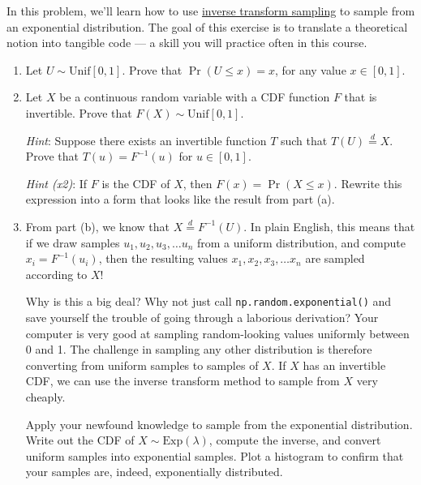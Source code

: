 \documentclass{harvardml}
\theoremstyle{definition}
\theoremstyle{plain}
\begin{document}
\begin{problem}
In this problem, we'll learn how to use \href{https://en.wikipedia.org/wiki/Inverse_transform_sampling}{inverse transform sampling}
to sample from an exponential distribution. The goal of this exercise is to
translate a theoretical notion into tangible code --- a skill you will practice
often in this course.

\begin{enumerate}[label=(\alph*)]
	\item Let $U \sim \text{Unif}[0, 1]$. Prove that $\Pr(U \leq x) = x$, for
	any value $x \in [0, 1]$. 
	\item Let $X$ be a continuous random variable with a CDF function $F$ that
	is invertible. Prove that $F(X) \sim \text{Unif}[0,1]$.

	\emph{Hint}: Suppose there exists an invertible function $T$ such that $T(U)
	\overset{d}{=} X$. Prove that $T(u) = F^{-1}(u)$ for $u \in [0, 1]$.

	\emph{Hint (x2)}: If $F$ is the CDF of $X$, then $F(x) = \Pr(X \leq x)$.
	Rewrite this expression into a form that looks like the result from
	part (a).

	\item From part (b), we know that $X \overset{d}{=} F^{-1}(U)$. In plain
	English, this means that if we draw samples $u_1, u_2, u_3, \ldots u_n$ from a
	uniform distribution, and compute $x_i = F^{-1}(u_i)$, then the resulting
	values $x_1, x_2, x_3, \ldots x_n$ are sampled according to $X$!
	
	Why is this a big deal? Why not just call \verb|np.random.exponential()| and
	save yourself the trouble of going through a laborious derivation? Your
	computer is very good at sampling random-looking values uniformly between 0
	and 1. The challenge in sampling any other distribution is therefore
	converting from uniform samples to samples of $X$. If $X$ has an invertible
	CDF, we can use the inverse transform method to sample from $X$ very cheaply.

	Apply your newfound knowledge to sample from the exponential distribution.
	Write out the CDF of $X \sim \text{Exp}(\lambda)$, compute the inverse, and 
	convert uniform samples into exponential samples. Plot a histogram to
	confirm that your samples are, indeed, exponentially distributed.




\end{enumerate}
\end{problem}
\end{document}
